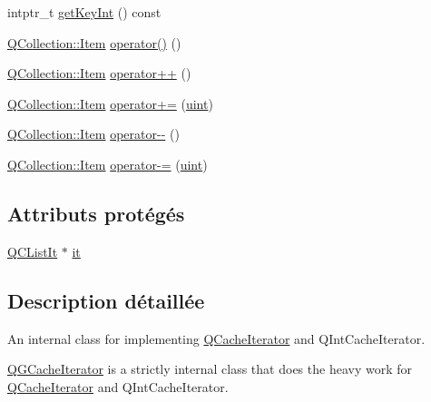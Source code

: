 \begin{DoxyCompactItemize}
\item 
intptr\+\_\+t \hyperlink{class_q_g_cache_iterator_a1aa8c836d001d977a24e4553260d5e57}{get\+Key\+Int} () const 
\item 
\hyperlink{class_q_collection_ac6f3ddbf999e31fb797927f71ae6b5d7}{Q\+Collection\+::\+Item} \hyperlink{class_q_g_cache_iterator_a3d702bf959300d3c181954d8b398d2d9}{operator()} ()
\item 
\hyperlink{class_q_collection_ac6f3ddbf999e31fb797927f71ae6b5d7}{Q\+Collection\+::\+Item} \hyperlink{class_q_g_cache_iterator_a0cf31a27e4743949ee48872624937919}{operator++} ()
\item 
\hyperlink{class_q_collection_ac6f3ddbf999e31fb797927f71ae6b5d7}{Q\+Collection\+::\+Item} \hyperlink{class_q_g_cache_iterator_a068bcc6886c34473521b06fd1a9b7819}{operator+=} (\hyperlink{qglobal_8h_a4d3943ddea65db7163a58e6c7e8df95a}{uint})
\item 
\hyperlink{class_q_collection_ac6f3ddbf999e31fb797927f71ae6b5d7}{Q\+Collection\+::\+Item} \hyperlink{class_q_g_cache_iterator_ae224f4794a4f12d435ca58675ee6dacd}{operator-\/-\/} ()
\item 
\hyperlink{class_q_collection_ac6f3ddbf999e31fb797927f71ae6b5d7}{Q\+Collection\+::\+Item} \hyperlink{class_q_g_cache_iterator_a578b570ee0b544271d5cb5e04289952d}{operator-\/=} (\hyperlink{qglobal_8h_a4d3943ddea65db7163a58e6c7e8df95a}{uint})
\end{DoxyCompactItemize}
\subsection*{Attributs protégés}
\begin{DoxyCompactItemize}
\item 
\hyperlink{class_q_c_list_it}{Q\+C\+List\+It} $\ast$ \hyperlink{class_q_g_cache_iterator_ac22be657c7cd8f63a5503c8ace720b0f}{it}
\end{DoxyCompactItemize}


\subsection{Description détaillée}
An internal class for implementing \hyperlink{class_q_cache_iterator}{Q\+Cache\+Iterator} and Q\+Int\+Cache\+Iterator. 

\hyperlink{class_q_g_cache_iterator}{Q\+G\+Cache\+Iterator} is a strictly internal class that does the heavy work for \hyperlink{class_q_cache_iterator}{Q\+Cache\+Iterator} and Q\+Int\+Cache\+Iterator. 

